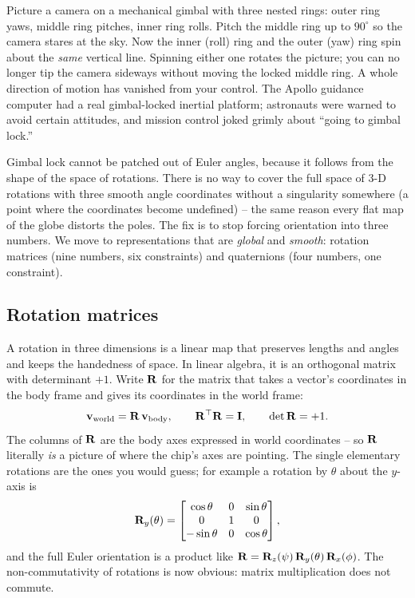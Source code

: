 \begin{intuitionbox}
Picture a camera on a mechanical gimbal with three nested rings: outer ring yaws,
middle ring pitches, inner ring rolls. Pitch the middle ring up to $90^\circ$ so the
camera stares at the sky. Now the inner (roll) ring and the outer (yaw) ring spin about
the \emph{same} vertical line. Spinning either one rotates the picture; you can no
longer tip the camera sideways without moving the locked middle ring. A whole direction
of motion has vanished from your control. The Apollo guidance computer had a real
gimbal-locked inertial platform; astronauts were warned to avoid certain attitudes, and
mission control joked grimly about ``going to gimbal lock.''
\end{intuitionbox}

Gimbal lock cannot be patched out of Euler angles, because it follows from the shape of the space of rotations.
There is no way to cover the full space of 3-D rotations with three smooth angle
coordinates without a singularity somewhere (a point where the coordinates become undefined) -- the same reason every flat map of the
globe distorts the poles. The fix is to stop forcing orientation into three numbers.
We move to representations that are \emph{global} and \emph{smooth}: rotation matrices
(nine numbers, six constraints) and quaternions (four numbers, one constraint).

\subsection{Rotation matrices}
\label{ch36:rotmat}

A rotation in three dimensions is a linear map that preserves lengths and angles and
keeps the handedness of space. In linear algebra, it is an
orthogonal matrix with determinant $+1$. Write
$\mathbf{R}$ for the matrix that takes a vector's coordinates in the body frame and gives
its coordinates in the world frame:
\[
  \mathbf{v}_{\text{world}} = \mathbf{R}\,\mathbf{v}_{\text{body}}, \qquad
  \mathbf{R}^\top \mathbf{R} = \mathbf{I}, \qquad \det \mathbf{R} = +1 .
\]
The columns of $\mathbf{R}$ are the body axes expressed in world coordinates -- so $\mathbf{R}$
literally \emph{is} a picture of where the chip's axes are pointing. The single
elementary rotations are the ones you would guess; for example a rotation by $\theta$
about the $y$-axis is
\[
  \mathbf{R}_y(\theta) =
  \begin{bmatrix} \cos\theta & 0 & \sin\theta \\ 0 & 1 & 0 \\ -\sin\theta & 0 & \cos\theta \end{bmatrix},
\]
and the full Euler orientation is a product like
$\mathbf{R} = \mathbf{R}_z(\psi)\,\mathbf{R}_y(\theta)\,\mathbf{R}_x(\phi)$. The non-commutativity
of rotations is now obvious: matrix multiplication does not commute.

